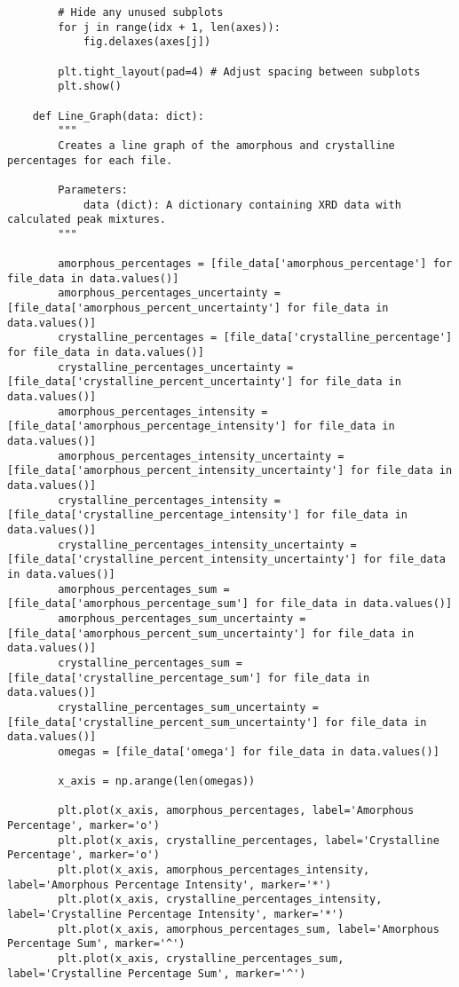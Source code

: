 \begin{lstlisting}
        # Hide any unused subplots
        for j in range(idx + 1, len(axes)):
            fig.delaxes(axes[j])

        plt.tight_layout(pad=4) # Adjust spacing between subplots
        plt.show()

    def Line_Graph(data: dict):
        """
        Creates a line graph of the amorphous and crystalline percentages for each file.

        Parameters:
            data (dict): A dictionary containing XRD data with calculated peak mixtures.
        """

        amorphous_percentages = [file_data['amorphous_percentage'] for file_data in data.values()]
        amorphous_percentages_uncertainty = [file_data['amorphous_percent_uncertainty'] for file_data in data.values()]
        crystalline_percentages = [file_data['crystalline_percentage'] for file_data in data.values()]
        crystalline_percentages_uncertainty = [file_data['crystalline_percent_uncertainty'] for file_data in data.values()]
        amorphous_percentages_intensity = [file_data['amorphous_percentage_intensity'] for file_data in data.values()]
        amorphous_percentages_intensity_uncertainty = [file_data['amorphous_percent_intensity_uncertainty'] for file_data in data.values()]
        crystalline_percentages_intensity = [file_data['crystalline_percentage_intensity'] for file_data in data.values()]
        crystalline_percentages_intensity_uncertainty = [file_data['crystalline_percent_intensity_uncertainty'] for file_data in data.values()]
        amorphous_percentages_sum = [file_data['amorphous_percentage_sum'] for file_data in data.values()]
        amorphous_percentages_sum_uncertainty = [file_data['amorphous_percent_sum_uncertainty'] for file_data in data.values()]
        crystalline_percentages_sum = [file_data['crystalline_percentage_sum'] for file_data in data.values()]
        crystalline_percentages_sum_uncertainty = [file_data['crystalline_percent_sum_uncertainty'] for file_data in data.values()]
        omegas = [file_data['omega'] for file_data in data.values()]

        x_axis = np.arange(len(omegas))

        plt.plot(x_axis, amorphous_percentages, label='Amorphous Percentage', marker='o')
        plt.plot(x_axis, crystalline_percentages, label='Crystalline Percentage', marker='o')
        plt.plot(x_axis, amorphous_percentages_intensity, label='Amorphous Percentage Intensity', marker='*')
        plt.plot(x_axis, crystalline_percentages_intensity, label='Crystalline Percentage Intensity', marker='*')
        plt.plot(x_axis, amorphous_percentages_sum, label='Amorphous Percentage Sum', marker='^')
        plt.plot(x_axis, crystalline_percentages_sum, label='Crystalline Percentage Sum', marker='^')


\end{lstlisting}

